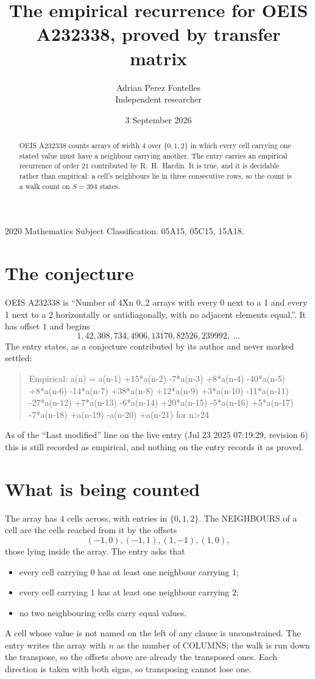 \documentclass[11pt,a4paper]{article}
\title{The empirical recurrence for OEIS A232338, proved by transfer matrix}
\author{Adrian Perez Fontelles\\ \small Independent researcher}
\date{3 September 2026}
\theoremstyle{plain}
\theoremstyle{definition}
\begin{document}
\maketitle

\begin{abstract}
OEIS A232338 counts arrays of width $4$ over $\{0,1,2\}$ in which every cell carrying one stated
value must have a neighbour carrying another. The entry carries an empirical recurrence of
order $21$ contributed by R.~H.~Hardin. It is true, and it is decidable rather than
empirical: a cell's neighbours lie in three consecutive rows, so the count is a walk count on
$S=394$ states.
\end{abstract}

\noindent\small 2020 Mathematics Subject Classification. 05A15, 05C15, 15A18.\normalsize

\section{The conjecture}

OEIS A232338 is ``Number of 4Xn 0..2 arrays with every 0 next to a 1 and every 1 next to a 2 horizontally or antidiagonally, with no adjacent elements equal.''. It has offset $1$ and begins
\[
1, 42, 308, 734, 4906, 13170, 82526, 239992,\ \dots
\]
The entry states, as a conjecture contributed by its author and never marked settled:
\begin{quote}
Empirical: a(n) = a(n-1) +15*a(n-2) -7*a(n-3) +8*a(n-4) -40*a(n-5) +8*a(n-6) -14*a(n-7) +38*a(n-8) +12*a(n-9) +3*a(n-10) -11*a(n-11) -27*a(n-12) +7*a(n-13) -6*a(n-14) +20*a(n-15) -5*a(n-16) +5*a(n-17) -7*a(n-18) +a(n-19) -a(n-20) +a(n-21) for n>24
\end{quote}
As of the ``Last modified'' line on the live entry (Jul 23 2025 07:19:29, revision 6) this is still
recorded as empirical, and nothing on the entry records it as proved.

\section{What is being counted}

The array has $4$ cells across, with entries in $\{0,1,2\}$. The NEIGHBOURS of a cell are the
cells reached from it by the offsets
\[
(-1,0), (-1,1), (1,-1), (1,0),
\]
those lying inside the array. The entry asks that
\begin{itemize}
\item every cell carrying $0$ has at least one neighbour carrying $1$;
\item every cell carrying $1$ has at least one neighbour carrying $2$;
\item no two neighbouring cells carry equal values.
\end{itemize}
A cell whose value is not named on the left of any clause is unconstrained. The entry writes the array with $n$ as the number of COLUMNS; the walk is run down the transpose, so the offsets above are already the transposed ones. Each direction is taken with both signs, so transposing cannot lose one.
\end{document}
